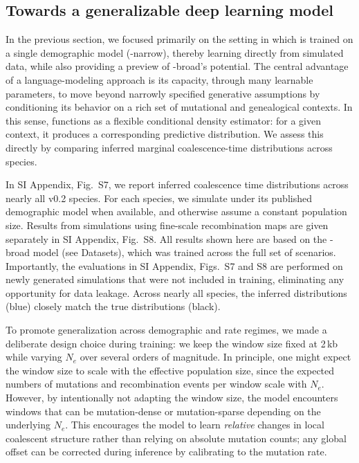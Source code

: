 \documentclass[9pt,twocolumn,twoside]{pnas-new}
\begin{document}
\subsection*{Towards a generalizable deep learning model}
In the previous section, we focused primarily on the setting in which \cxtkit is trained on a single demographic model (\cxtkit-narrow), 
thereby learning directly from simulated data, while also providing a preview of \cxtkit-broad's potential.
The central advantage of a language-modeling approach is its capacity, through many learnable parameters,
to move beyond narrowly specified generative assumptions by conditioning its behavior 
on a rich set of mutational and genealogical contexts.
In this sense, \cxtkit functions as a flexible conditional density estimator: for a given context, it produces a corresponding predictive distribution. 
We assess this directly by comparing inferred marginal coalescence-time distributions across species.


In SI Appendix, Fig.~S7, we report inferred coalescence time distributions across nearly all \stdpopsim v0.2 species. 
For each species, we simulate under its published demographic model when available, and otherwise assume a constant population size.
Results from simulations using fine-scale recombination maps are given separately in SI Appendix, Fig.~S8.
All results shown here are based on the \cxtkit-broad model (see Datasets), which was trained across the full set of scenarios.
Importantly, the evaluations in SI Appendix, Figs.~S7 and S8 are performed on newly generated simulations
that were not included in training, eliminating any opportunity for data leakage. 
Across nearly all species, the inferred distributions (blue) closely match the true distributions (black).


To promote generalization across demographic and rate regimes, 
we made a deliberate design choice during training: 
we keep the window size fixed at 2\,kb while varying $N_e$ over several orders of magnitude.
In principle, one might expect the window size to scale with the effective population size, 
since the expected numbers of mutations and recombination events per window scale with $N_e$. 
However, by intentionally not adapting the window size, the model encounters windows that can be
mutation-dense or mutation-sparse depending on the underlying $N_e$. 
This encourages the model to learn \emph{relative} changes in local coalescent structure rather than relying on absolute mutation counts;
any global offset can be corrected during inference by calibrating to the mutation rate.
\end{document}
